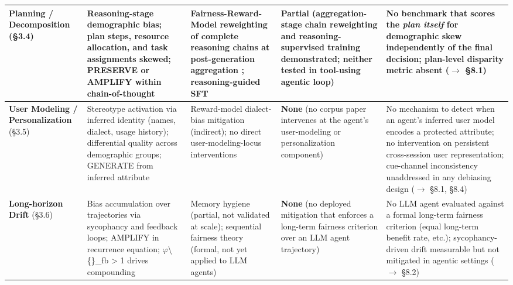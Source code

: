 \documentclass[10pt]{article}
\begin{document}
\begin{center}
\begin{longtable}{|p{}|p{}|p{}|p{}|p{}|}
\textbf{Planning / Decomposition} (\S{}3.4) & Reasoning-stage demographic bias; plan steps, resource allocation, and task assignments skewed; PRESERVE or AMPLIFY within chain-of-thought \cite{li2025actions,parziale2026once,wu2025reasoning} & Fairness-Reward-Model reweighting of complete reasoning chains at post-generation aggregation \cite{hall2025guiding}; reasoning-guided SFT \cite{kabra2025reasoning} & \textbf{Partial} (aggregation-stage chain reweighting and reasoning-supervised training demonstrated; neither tested in tool-using agentic loop) & No benchmark that scores the \emph{plan itself} for demographic skew independently of the final decision; plan-level disparity metric absent ($\rightarrow$ \S{}8.1) \\ \hline
\textbf{User Modeling / Personalization} (\S{}3.5) & Stereotype activation via inferred identity (names, dialect, usage history); differential quality across demographic groups; GENERATE from inferred attribute \cite{kantharuban2024stereotype,pawar2025presumed,mire2025rejected} & Reward-model dialect-bias mitigation \cite{mire2025rejected} (indirect); no direct user-modeling-locus interventions & \textbf{None} (no corpus paper intervenes at the agent's user-modeling or personalization component) & No mechanism to detect when an agent's inferred user model encodes a protected attribute; no intervention on persistent cross-session user representation; cue-channel inconsistency \cite{tonneau2026different} unaddressed in any debiasing design ($\rightarrow$ \S{}8.1, \S{}8.4) \\ \hline
\textbf{Long-horizon Drift} (\S{}3.6) & Bias accumulation over trajectories via sycophancy and feedback loops; AMPLIFY in recurrence equation; $\varphi$\textbackslash\{\}\_fb > 1 drives compounding \cite{ma2026implicit,wyllie2024fairness,liu2025truth} & Memory hygiene \cite{ma2026implicit} (partial, not validated at scale); sequential fairness theory \cite{xu2024adapting,hu2022achieving} (formal, not yet applied to LLM agents) & \textbf{None} (no deployed mitigation that enforces a long-term fairness criterion over an LLM agent trajectory) & No LLM agent evaluated against a formal long-term fairness criterion (equal long-term benefit rate, etc.); sycophancy-driven drift measurable \cite{hong2025measuring} but not mitigated in agentic settings ($\rightarrow$ \S{}8.2) \\ \hline
\end{longtable}\end{center}
\end{document}
